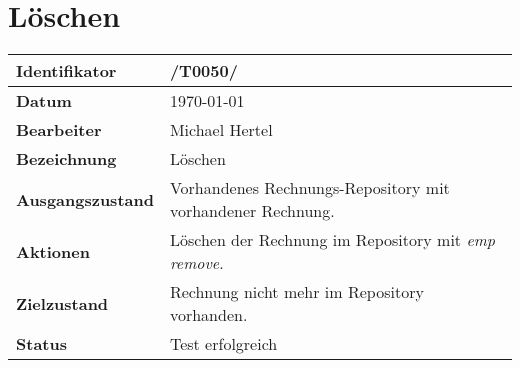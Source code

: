 
\section{Löschen}

\renewcommand{\arraystretch}{1.5}

\begin{center}
 \begin{tabular}{|p{}|p{}|}
	\hline
	\textbf{Identifikator}  & /T0050/ \\
	\hline
	\textbf{Datum} & \today \\
	\hline
	\textbf{Bearbeiter} & Michael Hertel \\
	\hline
	\textbf{Bezeichnung} & Löschen \\
	\hline
	\textbf{Ausgangszustand} &
		Vorhandenes Rechnungs-Repository mit vorhandener Rechnung. \\
	\hline
	\textbf{Aktionen} &
		Löschen der Rechnung im Repository mit \textit{emp remove}. \\
	\hline
	\textbf{Zielzustand} &
		Rechnung nicht mehr im Repository vorhanden. \\
	\hline
	\textbf{Status} & Test erfolgreich \\
	\hline
 \end{tabular}
\end{center}
